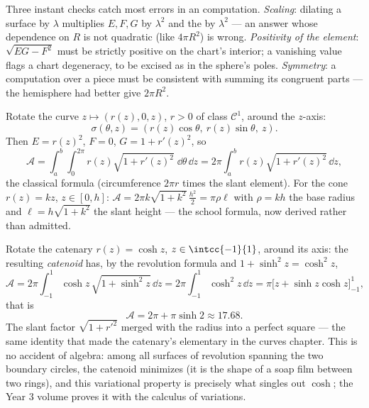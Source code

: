 \begin{remark}
Three instant checks catch most errors in an 
computation. \emph{Scaling}: dilating a surface by $\lambda$
multiplies $E, F, G$ by $\lambda^2$ and the  by
$\lambda^2$ --- an answer whose dependence on $R$ is not
quadratic (like $4\pi R^2$) is wrong. \emph{Positivity of the
element}: $\sqrt{EG - F^2}$ must be strictly positive on the
chart's interior; a vanishing value flags a chart degeneracy,
to be excised as in the sphere's poles. \emph{Symmetry}: a
computation over a  piece must be consistent with
summing its congruent parts --- the hemisphere had better
give $2\pi R^2$.
\end{remark}

\begin{example}\label{ex:b2:surfaces:revolution}
Rotate the curve $z \mapsto (r(z), 0, z)$, $r > 0$ of class
$\mathcal{C}^1$, around the $z$-axis:
\[
\sigma(\theta, z) = (r(z)\cos\theta,\ r(z)\sin\theta,\ z).
\]
Then $E = r(z)^2$, $F = 0$, $G = 1 + r'(z)^2$, so
\[
\mathcal{A} = \int_a^b\!\!\int_0^{2\pi}
r(z)\sqrt{1 + r'(z)^2}\;\dd\theta\,\dd z
= 2\pi\int_a^b r(z)\sqrt{1 + r'(z)^2}\,\dd z ,
\]
the classical formula (circumference $2\pi r$ times the slant
 element). For the cone $r(z) = kz$, $z \in [0, h]$: $\mathcal
A = 2\pi k\sqrt{1 + k^2}\,\frac{h^2}{2} = \pi \rho \ell$ with
$\rho = kh$ the base radius and $\ell = h\sqrt{1 + k^2}$ the slant
height --- the school formula, now derived rather than admitted.
\end{example}

\begin{example}\label{ex:b2:surfaces:catenoid}
Rotate the catenary $r(z) = \cosh z$, $z \in \intcc{-1}{1}$,
around its axis: the resulting \emph{catenoid} has, by the
revolution formula and $1 + \sinh^2 z = \cosh^2 z$,
\[
\mathcal A = 2\pi\int_{-1}^1\cosh z\,\sqrt{1 + \sinh^2z}\,
\dd z = 2\pi\int_{-1}^1\cosh^2z\,\dd z
= \pi\bigl[z + \sinh z\cosh z\bigr]_{-1}^{1},
\]
that is
\[
\mathcal A = 2\pi + \pi\sinh 2 \approx 17.68 .
\]
The slant factor $\sqrt{1 + r'^2}$ merged with the radius
into a perfect square --- the same identity that made the
catenary's  elementary in the curves chapter. This
is no accident of algebra: among all surfaces of revolution
spanning the two boundary circles, the catenoid minimizes
 (it is the shape of a soap film between two rings), and
this variational property is precisely what singles out
$\cosh$; the Year 3 volume proves it with the calculus of
variations.
\end{example}

